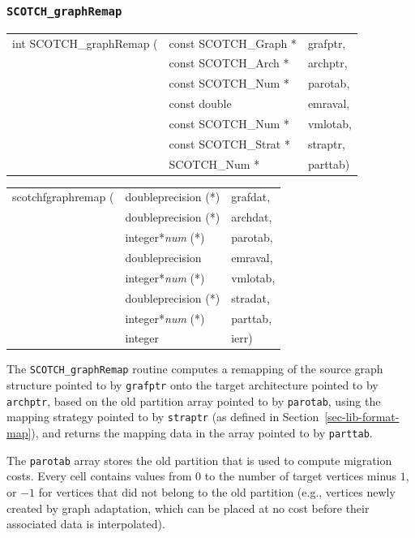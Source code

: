 \subsubsection{{\tt SCOTCH\_graphRemap}}

\begin{itemize}
\progsyn

{\tt\begin{tabular}{l@{}ll}
int SCOTCH\_graphRemap ( & const SCOTCH\_Graph * & grafptr, \\
                         & const SCOTCH\_Arch *  & archptr, \\
                         & const SCOTCH\_Num *   & parotab, \\
                         & const double          & emraval, \\
                         & const SCOTCH\_Num *   & vmlotab, \\
                         & const SCOTCH\_Strat * & straptr, \\
                         & SCOTCH\_Num *         & parttab)
\end{tabular}}

{\tt\begin{tabular}{l@{}ll}
scotchfgraphremap ( & doubleprecision (*)   & grafdat, \\
                    & doubleprecision (*)   & archdat, \\
                    & integer*{\it num} (*) & parotab, \\
                    & doubleprecision       & emraval, \\
                    & integer*{\it num} (*) & vmlotab, \\
                    & doubleprecision (*)   & stradat, \\
                    & integer*{\it num} (*) & parttab, \\
                    & integer               & ierr)
\end{tabular}}

\progdes

The {\tt SCOTCH\_graphRemap} routine computes a remapping of the
source graph structure pointed to by {\tt grafptr} onto the target
architecture pointed to by {\tt archptr}, based on the old partition
array pointed to by {\tt parotab}, using the mapping strategy pointed
to by {\tt straptr} (as defined in Section~\ref{sec-lib-format-map}),
and returns the mapping data in the array pointed to by {\tt parttab}.

The {\tt parotab} array stores the old partition that is used to
compute migration costs. Every cell contains values from $0$ to the
number of target vertices minus $1$, or $-1$ for vertices that did not
belong to the old partition (e.g., vertices newly created by graph
adaptation, which can be placed at no cost before their associated
data is interpolated).


\end{itemize}
